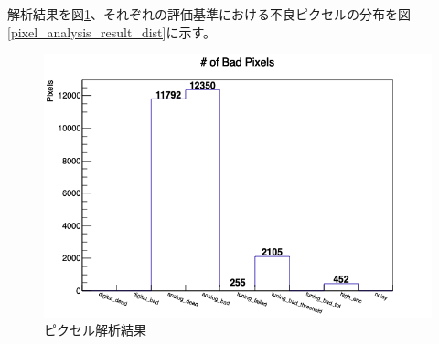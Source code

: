 解析結果を図\ref{pixel_analysis_result}、それぞれの評価基準における不良ピクセルの分布を図\ref{pixel_analysis_result_dist}に示す。

\begin{figure}[bpt]\centering
\includegraphics[width=12cm]{./data/analysis_result/Bad_Pixels.png}
\caption[ピクセル解析結果]{ピクセル解析結果}
\label{pixel_analysis_result}
\end{figure}

